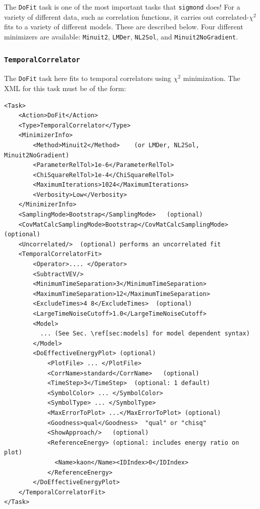 \documentclass[12pt]{article}
\newcommand{\vb}{\texttt}
\begin{document}
The \vb{DoFit} task is one of the most important tasks that \vb{sigmond} does!
For a variety of different data, such as correlation functions, it
carries out correlated-$\chi^2$ fits to a variety of different models.
These are described below.  Four different minimizers are available:
\vb{Minuit2}, \vb{LMDer}, \vb{NL2Sol}, and \vb{Minuit2NoGradient}.

\subsubsection{\vb{TemporalCorrelator}}
The \vb{DoFit} task here fits to temporal correlators using $\chi^2$ minimization.
The XML for this task must be of the form:

\begin{Verbatim}[commandchars=\\\[\]]
<Task>
    <Action>DoFit</Action>
    <Type>TemporalCorrelator</Type>
    <MinimizerInfo>
        <Method>Minuit2</Method>    (or LMDer, NL2Sol, Minuit2NoGradient)
        <ParameterRelTol>1e-6</ParameterRelTol>
        <ChiSquareRelTol>1e-4</ChiSquareRelTol>
        <MaximumIterations>1024</MaximumIterations>
        <Verbosity>Low</Verbosity>
    </MinimizerInfo>
    <SamplingMode>Bootstrap</SamplingMode>   (optional)
    <CovMatCalcSamplingMode>Bootstrap</CovMatCalcSamplingMode> (optional)
    <Uncorrelated/>  (optional) performs an uncorrelated fit
    <TemporalCorrelatorFit>
        <Operator>.... </Operator>
        <SubtractVEV/> 
        <MinimumTimeSeparation>3</MinimumTimeSeparation>
        <MaximumTimeSeparation>12</MaximumTimeSeparation>
        <ExcludeTimes>4 8</ExcludeTimes>  (optional)
        <LargeTimeNoiseCutoff>1.0</LargeTimeNoiseCutoff>
        <Model>
          ... (See Sec. \ref[sec:models] for model dependent syntax)
        </Model>
        <DoEffectiveEnergyPlot> (optional)
            <PlotFile> ... </PlotFile>
            <CorrName>standard</CorrName>   (optional)
            <TimeStep>3</TimeStep>  (optional: 1 default)
            <SymbolColor> ... </SymbolColor>
            <SymbolType> ... </SymbolType>
            <MaxErrorToPlot> ...</MaxErrorToPlot> (optional)
            <Goodness>qual</Goodness>  "qual" or "chisq"
            <ShowApproach/>   (optional)
            <ReferenceEnergy> (optional: includes energy ratio on plot)
              <Name>kaon</Name><IDIndex>0</IDIndex>
            </ReferenceEnergy>
        </DoEffectiveEnergyPlot>
    </TemporalCorrelatorFit>
</Task>
\end{Verbatim}
\end{document}
